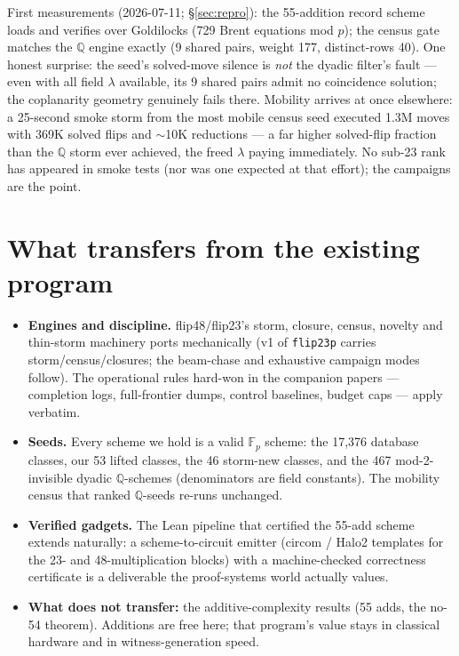 \documentclass[10pt]{article}
\begin{document}
First measurements (2026-07-11; \S\ref{sec:repro}): the 55-addition
record scheme loads and verifies over Goldilocks (729 Brent equations
mod $p$); the census gate matches the $\mathbb{Q}$ engine exactly (9
shared pairs, weight 177, distinct-rows 40). One honest surprise: the
seed's solved-move silence is \emph{not} the dyadic filter's fault
--- even with all field $\lambda$ available, its 9 shared pairs admit
no coincidence solution; the coplanarity geometry genuinely fails
there. Mobility arrives at once elsewhere: a 25-second smoke storm
from the most mobile census seed executed 1.3M moves with 369K solved
flips and ${\sim}$10K reductions --- a far higher solved-flip
fraction than the $\mathbb{Q}$ storm ever achieved, the freed
$\lambda$ paying immediately. No sub-23 rank has appeared in smoke
tests (nor was one expected at that effort); the campaigns are the
point.

\section{What transfers from the existing program}\label{sec:assets}

\begin{itemize}
\item \textbf{Engines and discipline.} flip48/flip23's storm,
  closure, census, novelty and thin-storm machinery ports
  mechanically (v1 of \texttt{flip23p} carries
  storm/census/closures; the beam-chase and exhaustive campaign
  modes follow). The operational rules hard-won in the companion
  papers --- completion logs, full-frontier dumps, control
  baselines, budget caps --- apply verbatim.
\item \textbf{Seeds.} Every scheme we hold is a valid $\mathbb{F}_p$
  scheme: the 17,376 database classes, our 53 lifted classes, the 46
  storm-new classes, and the 467 mod-2-invisible dyadic
  $\mathbb{Q}$-schemes (denominators are field constants). The
  mobility census that ranked $\mathbb{Q}$-seeds re-runs unchanged.
\item \textbf{Verified gadgets.} The Lean pipeline that certified
  the 55-add scheme extends naturally: a scheme-to-circuit emitter
  (circom / Halo2 templates for the 23- and 48-multiplication
  blocks) with a machine-checked correctness certificate is a
  deliverable the proof-systems world actually values.
\item \textbf{What does not transfer:} the additive-complexity
  results (55 adds, the no-54 theorem). Additions are free here;
  that program's value stays in classical hardware and in
  witness-generation speed.
\end{itemize}
\end{document}
